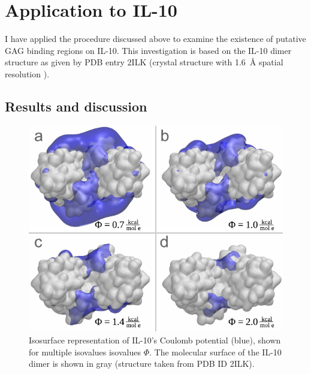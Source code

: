

\section{Application to IL-10}

I have applied the procedure discussed above to examine the existence of
putative GAG binding regions on IL-10. This investigation is based on the IL-10
dimer structure as given by PDB entry 2ILK (crystal structure with
\SI{1.6}{\angstrom} spatial resolution \cite{Zdanov1996}).

\subsection{Results and discussion}
\label{bspred:il10}

\begin{figure}
\centering
\includegraphics[width=1.0\textwidth]{gfx/bspred/il10_top_coulomb_isosurfaces_different_values_03_ds.pdf}
\caption[]{
Isosurface representation of IL-10's Coulomb potential (blue), shown for
multiple isovalues isovalues $\Phi$. The molecular surface of the IL-10 dimer is
shown in gray (structure taken from PDB ID 2ILK).
}
\label{fig:bspred:il10_multi_iso}
\end{figure}


